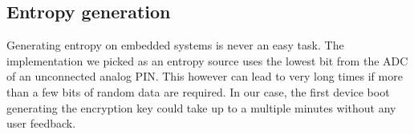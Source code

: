 \documentclass[a4paper,11pt]{scrartcl}
\begin{document}
\subsection{Entropy generation}\label{subsec:entropy}
Generating entropy on embedded systems is never an easy task. The implementation we picked as an entropy source uses the lowest bit from the ADC of an unconnected analog PIN. This however can lead to very long times if more than a few bits of random data are required. In our case, the first device boot generating the encryption key could take up to a multiple minutes without any user feedback.
\end{document}
